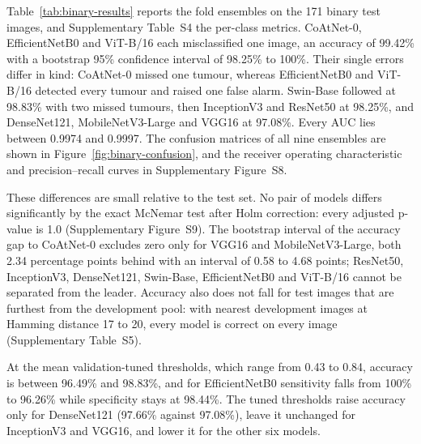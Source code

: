 \documentclass[final,3p,times,number]{elsarticle}
\begin{document}
Table~\ref{tab:binary-results} reports the fold ensembles on the 171 binary test images, and Supplementary Table~S4 the per-class metrics. CoAtNet-0, EfficientNetB0 and ViT-B/16 each misclassified one image, an accuracy of 99.42\% with a bootstrap 95\% confidence interval of 98.25\% to 100\%. Their single errors differ in kind: CoAtNet-0 missed one tumour, whereas EfficientNetB0 and ViT-B/16 detected every tumour and raised one false alarm. Swin-Base followed at 98.83\% with two missed tumours, then InceptionV3 and ResNet50 at 98.25\%, and DenseNet121, MobileNetV3-Large and VGG16 at 97.08\%. Every AUC lies between 0.9974 and 0.9997. The confusion matrices of all nine ensembles are shown in Figure~\ref{fig:binary-confusion}, and the receiver operating characteristic and precision--recall curves in Supplementary Figure~S8.

These differences are small relative to the test set. No pair of models differs significantly by the exact McNemar test after Holm correction: every adjusted p-value is 1.0 (Supplementary Figure~S9). The bootstrap interval of the accuracy gap to CoAtNet-0 excludes zero only for VGG16 and MobileNetV3-Large, both 2.34 percentage points behind with an interval of 0.58 to 4.68 points; ResNet50, InceptionV3, DenseNet121, Swin-Base, EfficientNetB0 and ViT-B/16 cannot be separated from the leader. Accuracy also does not fall for test images that are furthest from the development pool: with nearest development images at Hamming distance 17 to 20, every model is correct on every image (Supplementary Table~S5).

At the mean validation-tuned thresholds, which range from 0.43 to 0.84, accuracy is between 96.49\% and 98.83\%, and for EfficientNetB0 sensitivity falls from 100\% to 96.26\% while specificity stays at 98.44\%. The tuned thresholds raise accuracy only for DenseNet121 (97.66\% against 97.08\%), leave it unchanged for InceptionV3 and VGG16, and lower it for the other six models.
\end{document}
